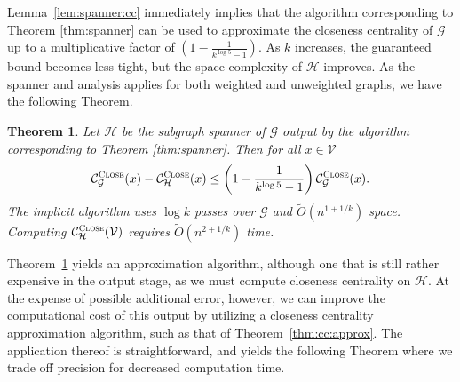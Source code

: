 \documentclass[10]{report}
\newtheorem{theorem}{Theorem}[section]
\newcommand{\algoname}[1]{\textnormal{\textsc{#1}}}
\begin{document}
Lemma~\ref{lem:spanner:cc} immediately implies that the algorithm corresponding to Theorem \ref{thm:spanner} can be used to approximate the closeness centrality of $\mathcal{G}$ up to a multiplicative factor of $\left ( 1- \frac{1}{k^{\log 5} - 1} \right )$.
As $k$ increases, the guaranteed bound becomes less tight, but the space complexity of $\mathcal{H}$ improves. 
As the spanner and analysis applies for both weighted and unweighted graphs, we have the following Theorem.

%
\begin{theorem} \label{thm:cc:sstream:approx:heavy}
Let $\mathcal{H}$ be the subgraph spanner of $\mathcal{G}$ output by the algorithm corresponding to Theorem \ref{thm:spanner}.
Then for all $x \in \mathcal{V}$
%
\begin{equation} \label{eq:spanner:cc:heavy}
\mathcal{C}^{\algoname{Close}}_{\mathcal{G}}(x) - \mathcal{C}^{\algoname{Close}}_{\mathcal{H}}(x) \leq \left ( 1 - \frac{1}{k^{\log 5} - 1} \right ) \mathcal{C}^{\algoname{Close}}_{\mathcal{G}}(x).
\end{equation}
%
The implicit algorithm uses $\log k$ passes over $\mathcal{G}$ and $\widetilde{O}(n^{1 + 1/k})$ space.
Computing $\mathcal{C}^{\algoname{Close}}_{\mathcal{H}}(\mathcal{V})$ requires $\widetilde{O}(n^{2 + 1/k})$ time.
\end{theorem}




Theorem~\ref{thm:cc:sstream:approx:heavy} yields an approximation algorithm, although one that is still rather expensive in the output stage, as we must compute closeness centrality on $\mathcal{H}$. 
At the expense of possible additional error, however, we can improve the computational cost of this output by utilizing a closeness centrality approximation algorithm, such as that of Theorem~\ref{thm:cc:approx}.
The application thereof is straightforward, and yields the following Theorem where we trade off precision for decreased computation time.
\end{document}
